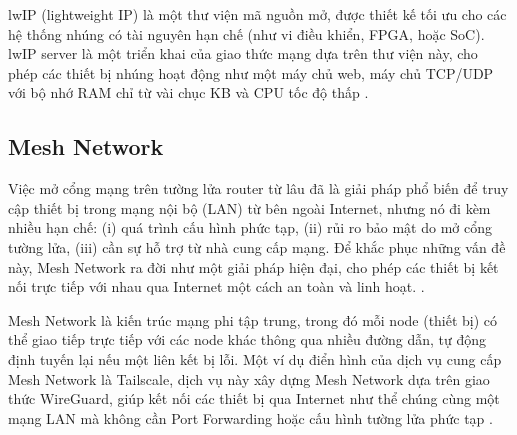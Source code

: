 \documentclass[../DoAn.tex]{subfiles}
\begin{document}
lwIP (lightweight IP) là một thư viện mã nguồn mở, được thiết kế tối ưu cho các hệ thống nhúng có tài nguyên hạn chế (như vi điều khiển, FPGA, hoặc SoC). lwIP server là một triển khai của giao thức mạng dựa trên thư viện này, cho phép các thiết bị nhúng hoạt động như một máy chủ web, máy chủ TCP/UDP với bộ nhớ RAM chỉ từ vài chục KB và CPU tốc độ thấp \cite{noauthor_lwip_nodate}.

\subsection{Mesh Network}
Việc mở cổng mạng trên tường lửa router từ lâu đã là giải pháp phổ biến để truy cập thiết bị trong mạng nội bộ (LAN) từ bên ngoài Internet, nhưng nó đi kèm nhiều hạn chế: (i) quá trình cấu hình phức tạp, (ii) rủi ro bảo mật do mở cổng tường lửa, (iii) cần sự hỗ trợ từ nhà cung cấp mạng. Để khắc phục những vấn đề này, Mesh Network ra đời như một giải pháp hiện đại, cho phép các thiết bị kết nối trực tiếp với nhau qua Internet một cách an toàn và linh hoạt. \cite{mesh_network}.

Mesh Network là kiến trúc mạng phi tập trung, trong đó mỗi node (thiết bị) có thể giao tiếp trực tiếp với các node khác thông qua nhiều đường dẫn, tự động định tuyến lại nếu một liên kết bị lỗi. Một ví dụ điển hình của dịch vụ cung cấp Mesh Network là Tailscale, dịch vụ này xây dựng Mesh Network dựa trên giao thức WireGuard, giúp kết nối các thiết bị qua Internet như thể chúng cùng một mạng LAN mà không cần Port Forwarding hoặc cấu hình tường lửa phức tạp \cite{noauthor_tailscale_nodate}.
\end{document}
